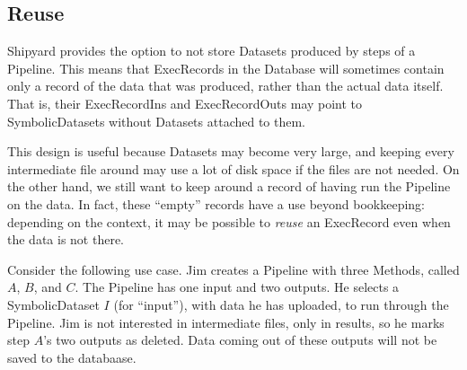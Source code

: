 \documentclass[12pt]{article}
\begin{document}
\subsection*{Reuse}

Shipyard provides the option to not store Datasets produced by steps of a
Pipeline. This means that ExecRecords in the Database will sometimes
contain only a record of the data that was produced, rather than the actual
data itself. That is, their ExecRecordIns and ExecRecordOuts may point to
SymbolicDatasets without Datasets attached to them. 

This design is useful because Datasets may become very large, and keeping every
intermediate file around may use a lot of disk space if the files are not
needed. On the other hand, we still want to keep around a record of having run
the Pipeline on the data. In fact, these ``empty'' records have a use beyond
bookkeeping: depending on the context, it may be possible to \emph{reuse} an
ExecRecord even when the data is not there.

Consider the following use case. Jim creates a Pipeline with three Methods,
called $A$, $B$, and $C$. The Pipeline has one input and two outputs. He
selects a SymbolicDataset $I$ (for ``input''), with data he has uploaded, to
run through the Pipeline. Jim is not interested in intermediate files, only in
results, so he marks step $A$'s two outputs as deleted. Data coming out of
these outputs will not be saved to the databaase.
\end{document}
